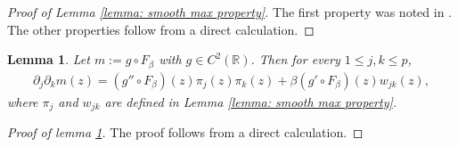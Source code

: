 \documentclass[11pt,reqno]{amsart}
\newtheorem{lemma}{Lemma}
\theoremstyle{definition}
\newcommand{\RR}{\mathbb{R}}
\begin{document}
\begin{proof}[Proof of Lemma \ref{lemma: smooth max property}]
The first property was noted in \cite{Chatterjee2005b}.  The other properties follow from a direct calculation.
\end{proof}

\begin{lemma}\label{lemma: second deriv m}
Let $m := g \circ F_{\beta}$ with $g \in C^{2}(\RR)$. Then for every $1 \leq j,k \leq p$,
\begin{align*}
\partial_{j} \partial_k m(z) =   (g'' \circ F_\beta) (z) \pi_{j} (z) \pi_{k} (z)+ \beta (g' \circ F_\beta) (z) w_{jk}(z),
\end{align*}
where $\pi_{j}$ and $w_{jk}$ are defined in Lemma \ref{lemma: smooth max property}.

\end{lemma}
\begin{proof}[Proof of lemma \ref{lemma: second deriv m}]
The proof follows from a direct calculation.
\end{proof}
\end{document}
